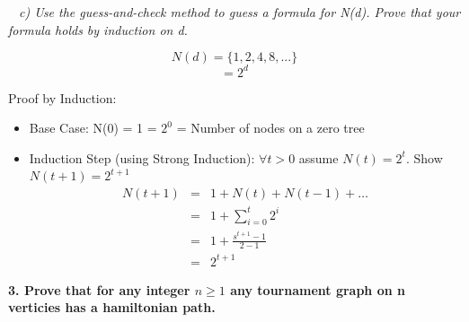 \documentclass[12pt, letterpaper]{article}
\begin{document}
\-\ \it{ c) Use the guess-and-check method to guess a formula for N(d). Prove that your formula holds by induction on d. }

\[N(d) = \{1, 2, 4, 8, ...\}\]
\[ = 2^d \]

\textnormal{Proof by Induction:}
\begin{itemize}
  \item \textnormal{Base Case:} \newline
  N(0) = 1 = \(2^0\) = Number of nodes on a zero tree \newline

  \item \textnormal{ Induction Step (using Strong Induction): } \newline
  \textnormal{ \(\forall t > 0 \) assume \(N(t) = 2^t\). Show \(N(t + 1) = 2^{t + 1}\) } \\
  \begin{eqnarray*}
    N(t + 1) &=& 1 + N(t) + N(t - 1) + \dots \\
    &=& 1 + \sum_{i = 0}^{t} 2^i \\
    &=& 1 + \frac{s^{t + 1} - 1}{2 - 1} \\
    &=& 2^{t + 1}
  \end{eqnarray*}

\end{itemize}

\newpage
\bf{ 3. Prove that for any integer \(n \ge 1\) any tournament graph on n verticies has a hamiltonian path. }
\end{document}
